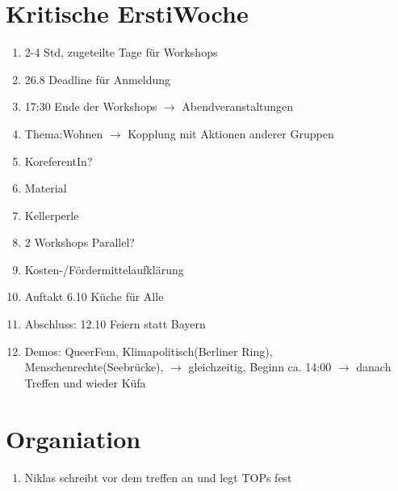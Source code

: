 \documentclass{article}
\begin{document}
  \section{Kritische ErstiWoche}
    \begin{enumerate}
      \item 2-4 Std, zugeteilte Tage für Workshops
      \item 26.8 Deadline für Anmeldung
      \item 17:30 Ende der Workshops $\rightarrow$ Abendveranstaltungen
      \item Thema:Wohnen $\rightarrow$ Kopplung mit Aktionen anderer Gruppen
      \item KoreferentIn?
      \item Material
      \item Kellerperle
      \item 2 Workshops Parallel?
      \item Kosten-/Fördermittelaufklärung
      \item Auftakt 6.10 Küche für Alle
      \item Abschluss: 12.10 Feiern statt Bayern
      \item Demos: QueerFem, Klimapolitisch(Berliner Ring), Menschenrechte(Seebrücke), $\rightarrow$ gleichzeitig, Beginn ca. 14:00 $\rightarrow$ danach Treffen und wieder Küfa
    \end{enumerate}
  \section{Organiation}
    \begin{enumerate}
      \item Niklas schreibt vor dem treffen an und legt TOPs fest
    \end{enumerate}  
\end{document}
